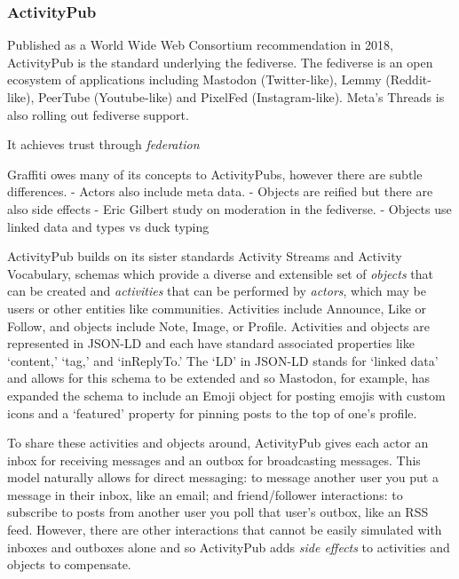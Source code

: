 
\subsubsection{ActivityPub}

Published as a World Wide Web Consortium recommendation in 2018, ActivityPub is the standard underlying the fediverse. The fediverse is an open ecosystem of applications including Mastodon (Twitter-like), Lemmy (Reddit-like), PeerTube (Youtube-like) and PixelFed (Instagram-like).
Meta's Threads is also rolling out fediverse support.

It achieves trust through \emph{federation}

Graffiti owes many of its concepts to ActivityPubs, however there are subtle differences.
- Actors also include meta data.
- Objects are reified but there are also side effects
- Eric Gilbert study on moderation in the fediverse.
- Objects use linked data and types vs duck typing

ActivityPub builds on its sister standards Activity Streams and Activity Vocabulary, schemas which provide a diverse and extensible set of \emph{objects} that can be created and \emph{activities} that can be performed by \emph{actors}, which may be users or other entities like communities.
Activities include Announce, Like or Follow, and objects include Note, Image, or Profile.
Activities and objects are represented in JSON-LD and each have standard associated properties like `content,' `tag,' and `inReplyTo.'
The `LD' in JSON-LD stands for `linked data' and allows for this schema to be extended and so
Mastodon, for example, has expanded the schema to include an Emoji object for posting emojis with custom icons and a `featured' property for pinning posts to the top of one's profile.

To share these activities and objects around, ActivityPub gives each actor an inbox for receiving messages and an outbox for broadcasting messages.
This model naturally allows for direct messaging: to message another user you put a message in their inbox, like an email; and friend/follower interactions: to subscribe to posts from another user you poll that user's outbox, like an RSS feed.
However, there are other interactions that cannot be easily simulated with inboxes and outboxes alone and so ActivityPub adds \emph{side effects} to activities and objects to compensate.

